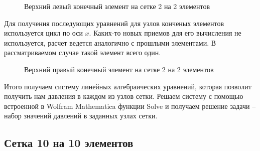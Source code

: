 \documentclass[12pt, a4paper]{article}
\begin{document}
\begin{figure}[!htbp]
	\caption{Верхний левый конечный элемент на сетке 2 на 2 элементов}
	\label{left-top-el}
\end{figure}
\newpage
Для получения последующих уравнений для узлов конченых элементов используется цикл по оси $x$. Каких-то новых приемов для его вычисления не используется, расчет ведется аналогично с прошлыми элементами. В рассматриваемом случае такой элемент всего один.
\begin{figure}[!htbp]
	\caption{Верхний правый конечный элемент на сетке 2 на 2 элементов}
	\label{right-top-el}
\end{figure}

Итого получаем систему линейных алгебраических уравнений, которая позволит получить нам давления в каждом из узлов сетки. Решаем систему с помощью встроенной в Wolfram Mathematica функции Solve и получаем решение задачи -- набор значений давлений в заданных узлах сетки.

\subsection{Сетка 10 на 10 элементов}
\end{document}
